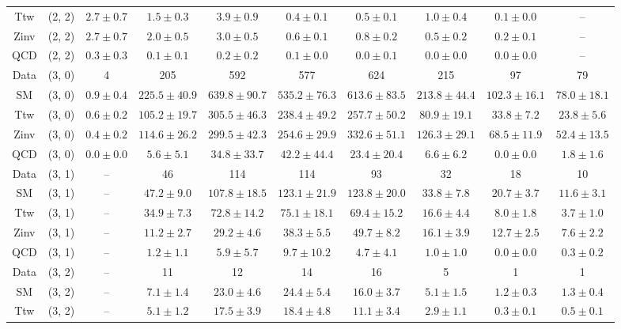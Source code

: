\begin{table}[h!]
{\begin{tabular}{cccccccccc}
	Ttw & (2, 2) & $2.7\pm 0.7$ & $1.5\pm 0.3$ & $3.9\pm 0.9$ & $0.4\pm 0.1$ & $0.5\pm 0.1$ & $1.0\pm 0.4$ & $0.1\pm 0.0$ & -- \\[0.5ex] 
	Zinv & (2, 2) & $2.7\pm 0.7$ & $2.0\pm 0.5$ & $3.0\pm 0.5$ & $0.6\pm 0.1$ & $0.8\pm 0.2$ & $0.5\pm 0.2$ & $0.2\pm 0.1$ & -- \\[0.5ex] 
	QCD & (2, 2) & $0.3\pm 0.3$ & $0.1\pm 0.1$ & $0.2\pm 0.2$ & $0.1\pm 0.0$ & $0.0\pm 0.1$ & $0.0\pm 0.0$ & $0.0\pm 0.0$ & -- \\[0.5ex] 
	Data & (3, 0) & 4 & 205 & 592 & 577 & 624 & 215 & 97 & 79 \\[0.5ex] 
	SM & (3, 0) & $0.9\pm 0.4$ & $225.5\pm 40.9$ & $639.8\pm 90.7$ & $535.2\pm 76.3$ & $613.6\pm 83.5$ & $213.8\pm 44.4$ & $102.3\pm 16.1$ & $78.0\pm 18.1$ \\[0.5ex] 
	Ttw & (3, 0) & $0.6\pm 0.2$ & $105.2\pm 19.7$ & $305.5\pm 46.3$ & $238.4\pm 49.2$ & $257.7\pm 50.2$ & $80.9\pm 19.1$ & $33.8\pm 7.2$ & $23.8\pm 5.6$ \\[0.5ex] 
	Zinv & (3, 0) & $0.4\pm 0.2$ & $114.6\pm 26.2$ & $299.5\pm 42.3$ & $254.6\pm 29.9$ & $332.6\pm 51.1$ & $126.3\pm 29.1$ & $68.5\pm 11.9$ & $52.4\pm 13.5$ \\[0.5ex] 
	QCD & (3, 0) & $0.0\pm 0.0$ & $5.6\pm 5.1$ & $34.8\pm 33.7$ & $42.2\pm 44.4$ & $23.4\pm 20.4$ & $6.6\pm 6.2$ & $0.0\pm 0.0$ & $1.8\pm 1.6$ \\[0.5ex] 
	Data & (3, 1) & -- & 46 & 114 & 114 & 93 & 32 & 18 & 10 \\[0.5ex] 
	SM & (3, 1) & -- & $47.2\pm 9.0$ & $107.8\pm 18.5$ & $123.1\pm 21.9$ & $123.8\pm 20.0$ & $33.8\pm 7.8$ & $20.7\pm 3.7$ & $11.6\pm 3.1$ \\[0.5ex] 
	Ttw & (3, 1) & -- & $34.9\pm 7.3$ & $72.8\pm 14.2$ & $75.1\pm 18.1$ & $69.4\pm 15.2$ & $16.6\pm 4.4$ & $8.0\pm 1.8$ & $3.7\pm 1.0$ \\[0.5ex] 
	Zinv & (3, 1) & -- & $11.2\pm 2.7$ & $29.2\pm 4.6$ & $38.3\pm 5.5$ & $49.7\pm 8.2$ & $16.1\pm 3.9$ & $12.7\pm 2.5$ & $7.6\pm 2.2$ \\[0.5ex] 
	QCD & (3, 1) & -- & $1.2\pm 1.1$ & $5.9\pm 5.7$ & $9.7\pm 10.2$ & $4.7\pm 4.1$ & $1.0\pm 1.0$ & $0.0\pm 0.0$ & $0.3\pm 0.2$ \\[0.5ex] 
	Data & (3, 2) & -- & 11 & 12 & 14 & 16 & 5 & 1 & 1 \\[0.5ex] 
	SM & (3, 2) & -- & $7.1\pm 1.4$ & $23.0\pm 4.6$ & $24.4\pm 5.4$ & $16.0\pm 3.7$ & $5.1\pm 1.5$ & $1.2\pm 0.3$ & $1.3\pm 0.4$ \\[0.5ex] 
	Ttw & (3, 2) & -- & $5.1\pm 1.2$ & $17.5\pm 3.9$ & $18.4\pm 4.8$ & $11.1\pm 3.4$ & $2.9\pm 1.1$ & $0.3\pm 0.1$ & $0.5\pm 0.1$ \\[0.5ex] 

\end{tabular}}
\end{table}
